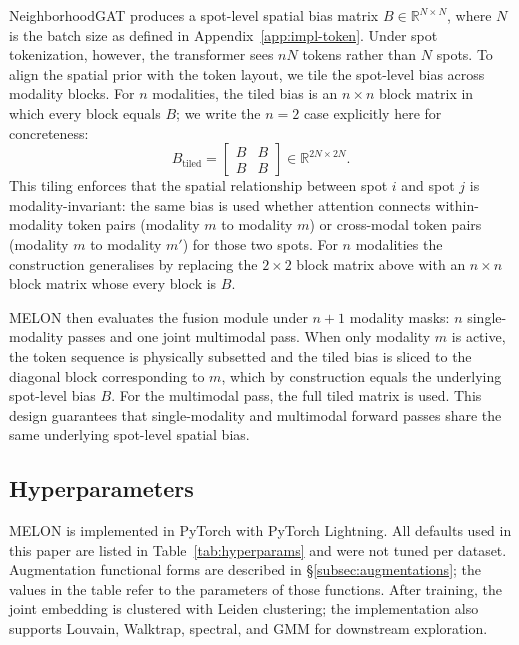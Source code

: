 \documentclass{article}
\theoremstyle{plain}
\theoremstyle{definition}
\begin{document}
NeighborhoodGAT produces a spot-level spatial bias matrix $B \in \mathbb{R}^{N \times N}$, where $N$ is the batch size as defined in Appendix~\ref{app:impl-token}. Under spot tokenization, however, the transformer sees $nN$ tokens rather than $N$ spots. To align the spatial prior with the token layout, we tile the spot-level bias across modality blocks. For $n$ modalities, the tiled bias is an $n \times n$ block matrix in which every block equals $B$; we write the $n=2$ case explicitly here for concreteness:
\begin{equation}
  B_{\mathrm{tiled}} =
  \begin{bmatrix}
    B & B \\
    B & B
  \end{bmatrix}
  \in \mathbb{R}^{2N \times 2N}.
\end{equation}
This tiling enforces that the spatial relationship between spot $i$ and spot $j$ is modality-invariant: the same bias is used whether attention connects within-modality token pairs (modality $m$ to modality $m$) or cross-modal token pairs (modality $m$ to modality $m'$) for those two spots. For $n$ modalities the construction generalises by replacing the $2 \times 2$ block matrix above with an $n \times n$ block matrix whose every block is $B$.

MELON then evaluates the fusion module under $n + 1$ modality masks: $n$ single-modality passes and one joint multimodal pass. When only modality $m$ is active, the token sequence is physically subsetted and the tiled bias is sliced to the diagonal block corresponding to $m$, which by construction equals the underlying spot-level bias $B$. For the multimodal pass, the full tiled matrix is used. This design guarantees that single-modality and multimodal forward passes share the same underlying spot-level spatial bias.

\subsection{Hyperparameters}\label{app:impl-hparams}

MELON is implemented in PyTorch with PyTorch Lightning. All defaults used in this paper are listed in Table~\ref{tab:hyperparams} and were not tuned per dataset. Augmentation functional forms are described in \S\ref{subsec:augmentations}; the values in the table refer to the parameters of those functions. After training, the joint embedding is clustered with Leiden clustering; the implementation also supports Louvain, Walktrap, spectral, and GMM for downstream exploration.
\end{document}

